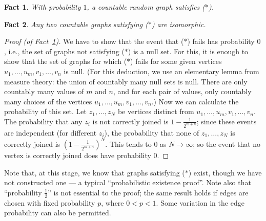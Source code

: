 \documentclass{book}
\newtheorem{fact}{Fact}
\begin{document}
\begin{fact}\label{ch32:subsec2.1.1}
With probability $1$, a countable random graph satisfies ($\ast$).
\end{fact}

\begin{fact}\label{ch32:subsec2.1.2} 
Any two countable graphs satisfying ($\ast$) are isomorphic.
\end{fact}

\begin{proof}[Proof (of Fact~\ref{ch32:subsec2.1.1})]
We have to show
that the event that ($\ast$) fails has probability $0$, i.e., the set
of graphs not satisfying ($\ast$) is a null set. For this, it is
enough to show that the set of graphs for which ($\ast$) fails for
some given vertices $u_1, \ldots, u_m, v_1, \ldots, v_n$ is null.
(For this deduction, we use an elementary lemma from measure theory:
the union of countably many null sets is null. There are only
countably many values of $m$ and $n$, and for each pair of values,
only countably many choices of the vertices $u_1, \ldots, u_m, v_1,
\ldots, v_n$.) Now we can calculate the probability of this set.
Let $z_1,\ldots,z_N$ be vertices distinct from $u_1, \ldots, u_m,
v_1, \ldots, v_n$. The probability that any $z_i$ is not correctly
joined is $1- \frac{1}{2^{m+n}}$; since these events are independent
(for different $z_i$), the probability that none of $z_1,\ldots,z_N$
is correctly joined is $(1 - \frac{1}{2^{m+n}})^N$. This tends to $0$
as $N \rightarrow \infty$; so the event that no vertex is correctly
joined does have probability $0$.
\end{proof}

Note that, at this stage, we know that graphs satisfying ($\ast$)
exist, though we have not constructed one --- a typical
``probabilistic existence proof''. Note also that ``probability
$\frac{1}{2}$'' is not essential to the proof; the same result holds
if edges are chosen with fixed probability $p$, where $0 < p < 1$.
Some variation in the edge probability can also be permitted.
\end{document}
